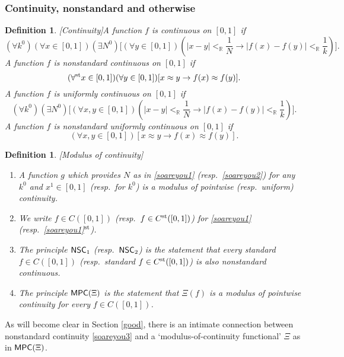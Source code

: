 \documentclass[reqno]{amsart}
\newtheorem{defi}[thm]{Definition}
\newcommand\be{\begin{equation}}
\newcommand\ee{\end{equation}}
\def\bdefi{\begin{defi}\rm}
\def\edefi{\end{defi}}
\def\R{{\mathbb  R}}
\def\R{{\mathbb{R}}}
\def\st{\textup{st}}
\def\di{\rightarrow}
\def\MPC{\textup{\textsf{MPC}}}
\def\NSC{\textup{\textsf{NSC}}}
\numberwithin{equation}{section}
\numberwithin{thm}{section}
\begin{document}
\subsubsection{Continuity, nonstandard and otherwise}
\bdefi[Continuity]\label{Kont}
A function $f$ is \emph{continuous} on $[0,1]$ if
\be\label{soareyou1}\textstyle
(\forall k^{0})(\forall x\in [0,1])(\exists N^{0})\big[(\forall y\in [0,1])(|x-y|<_{\R}\frac{1}{N}\di |f(x)-f(y)|<_{\R}\frac{1}{k})\big].
\ee
A function $f$ is \emph{nonstandard continuous} on $[0,1]$ if
\be\label{soareyou3}
(\forall^{\st}x\in [0,1])(\forall y\in [0,1])[x\approx y \di f(x)\approx f(y)].
\ee
A function $f$ is \emph{uniformly continuous} on $[0,1]$ if
\be\label{soareyou2}\textstyle
(\forall k^{0})(\exists N^{0})\big[(\forall x, y\in [0,1])(|x-y|<_{\R}\frac{1}{N}\di |f(x)-f(y)|<_{\R}\frac{1}{k})\big].
\ee
A function $f$ is \emph{nonstandard uniformly continuous} on $[0,1]$ if
\be\label{soareyou4}
(\forall x, y\in [0,1])[x\approx y \di f(x)\approx f(y)].
\ee
\edefi
\bdefi[Modulus of continuity]\label{mikeh}~
\begin{enumerate}
\item A function $g$ which provides $N$ as in \eqref{soareyou1} (resp.\ \eqref{soareyou2}) for any $k^{0}$ and $ x^{1}\in [0,1]$ (resp.\ for $k^{0}$) is a \emph{modulus} of pointwise (resp.\ uniform) continuity.  
\item We write $f\in C([0,1])$ (resp.\ $f\in C^{\st}([0,1])$) for \eqref{soareyou1} (resp.\ \eqref{soareyou1}$^{\st}$).  
\item The principle $\NSC_{1}$ (resp.\ $\NSC_{2}$) is the statement that every standard $f\in C([0,1])$ (resp.\ standard $f\in C^{\st}([0,1])$) is also nonstandard continuous.  
\item The principle $\MPC(\Xi)$ is the statement that $\Xi(f)$ is a modulus of pointwise continuity for every $f\in C([0,1])$.  
\end{enumerate}
\edefi
As will become clear in Section \ref{good}, there is an intimate connection between nonstandard continuity \eqref{soareyou3} and a `modulus-of-continuity functional' $\Xi$ as in $\MPC(\Xi)$.  
\end{document}
